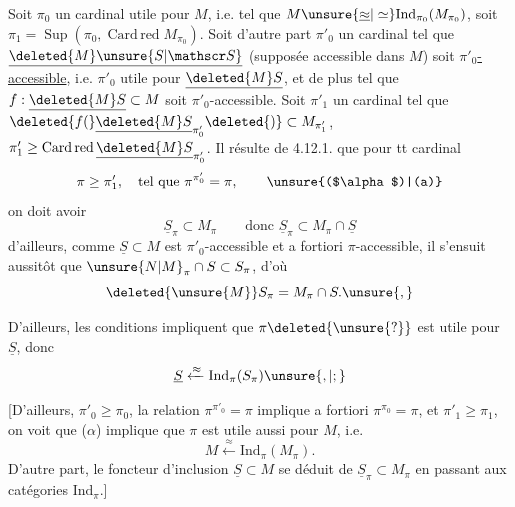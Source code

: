 Soit $\pi_0$ un cardinal utile pour
$M$, i.e. tel que $M\unsure{\underline{\approx}|\simeq}\mathrm{Ind}_{\pi_0}(M_{\pi_0})$,
soit $\pi_1=\operatorname{Sup}(\pi_0,\operatorname{Card\,red} M_{\pi_0})$. Soit
d'autre part $\pi'_0$ un cardinal tel que
$\underline{\deleted{M}\unsure{S|\mathscr S}}$ (supposée accessible dans $M$) soit
\uline{$\pi'_0$-accessible}, i.e. $\pi'_0$ utile pour $\underline{\deleted{M}S}$, et
de plus tel que $f:\underline{\deleted{M}S}\subset M$ soit $\pi'_0$-accessible.
 Soit $\pi'_1$  un cardinal tel que
$\deleted{f(}\underline{\deleted{M}S}_{\pi'_0}\deleted{)}\subset M_{\pi'_1}$, $\pi'_1\geq\operatorname{Card\,red}\underline{\deleted{M}S}_{\pi'_0}$.
Il résulte de
4.12.1. que pour tt cardinal
\[
 \pi\geq\pi'_1,\quad\text{tel que }\pi^{\pi'_0}=\pi,\tag*{\unsure{($\alpha$)|(a)}}
\]
on doit avoir
\[
 \underline S_\pi\subset M_\pi\qquad\text{donc }\underline S_\pi\subset M_\pi\cap\underline S
\]
d'ailleurs, comme $\underline S\subset M$ est $\pi'_0$-accessible
et a fortiori $\pi$-accessible,  il s'ensuit
aussitôt que $\unsure{N|M}_\pi\cap S\subset S_\pi$, d'où\unsure{:}
\[
 \deleted{\unsure{M}}S_\pi=M_\pi\cap S.\unsure{,}
\]

D'ailleurs, les conditions  impliquent que
$\pi\deleted{\unsure{?}}$ est utile pour $\underline S$, donc
\[
 \underline S\xleftarrow{\approx}\mathrm{Ind}_\pi(S_\pi)\unsure{,|;}
\]

[D'ailleurs,  \uline{$\pi'_0\geq\pi_0$}, la relation
$\pi^{\pi'_0}=\pi$ implique a fortiori $\pi^{\pi_0}=\pi$,
et  \uline{$\pi'_1\geq\pi_1$}, on voit que
($\alpha$) implique que $\pi$ est utile aussi
pour $M$, i.e.
\[
 M\xleftarrow{\approx}\mathrm{Ind}_\pi(M_\pi).
\]
D'autre part, le foncteur d'inclusion
$\underline S\subset M$ se déduit  de $\underline S_\pi\subset M_\pi$
en passant aux catégories $\mathrm{Ind}_\pi$.]

